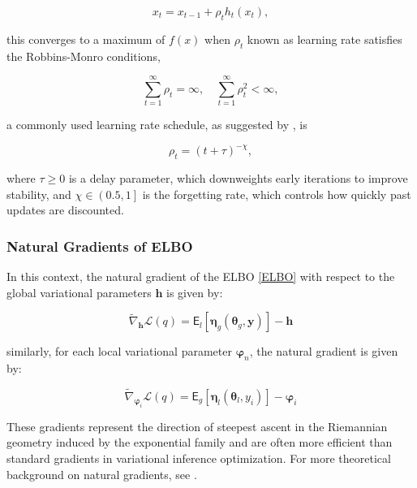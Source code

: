 \begin{equation}
    \label{stoch_opt}
    x_t=x_{t-1}+\rho_th_t(x_t),
\end{equation}

this converges to a maximum of $f(x)$ when $\rho_{t}$ known as learning rate satisfies the Robbins-Monro  conditions,

\begin{equation*}
    \sum_{t=1}^{\infty}\rho_t=\infty,\quad
    \sum_{t=1}^{\infty}\rho_t^2<\infty,
\end{equation*}

\vspace{0.5cm}

a commonly used learning rate schedule, as suggested by \cite{HOFFMAN}, is

\begin{equation}
\rho_t=(t+\tau)^{-\chi} ,   
\end{equation}

where $\tau\geq0$ is a delay parameter, which downweights early iterations to improve stability, and $\chi\in\left(0.5,1\right]$ is the forgetting rate, which controls how quickly past updates are discounted.

\subsubsection{Natural Gradients of ELBO}

In this context, the natural gradient of the ELBO \ref{ELBO} with respect to the global variational parameters $ \bm{h} $ is given by:

\begin{equation}
\widetilde{\nabla}_{\bm{h}} \mathcal{L}(q) = \mathsf{E}_{l}\left[\bm{\eta}_g(\bm{\theta}_{g}, \bm{y})\right] - \bm{h}
\end{equation}

similarly, for each local variational parameter $ \bm{\varphi}_n $, the natural gradient is given by:

\begin{equation}
\widetilde{\nabla}_{\bm{\varphi}_i} \mathcal{L}(q) = \mathsf{E}_{g}\left[\bm{\eta}_l(\bm{\theta}_l, y_i)\right] - \bm{\varphi}_i
\end{equation}

These gradients represent the direction of steepest ascent in the Riemannian geometry induced by the exponential family and are often more efficient than standard gradients in variational inference optimization. For more theoretical background on natural gradients, see \cite{AMARI}.

